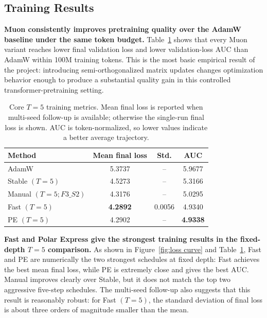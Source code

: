 \documentclass[10pt]{article}
\begin{document}
\subsection{Training Results}

\textbf{Muon consistently improves pretraining quality over the AdamW baseline under the same token budget.} Table~\ref{tab:train} shows that every Muon variant reaches lower final validation loss and lower validation-loss AUC than AdamW within 100M training tokens. This is the most basic empirical result of the project: introducing semi-orthogonalized matrix updates changes optimization behavior enough to produce a substantial quality gain in this controlled transformer-pretraining setting.

\begin{table}[htbp]
\centering

\centering
\caption{Core $T=5$ training metrics. Mean final loss is reported when multi-seed follow-up is available; otherwise the single-run final loss is shown. AUC is token-normalized, so lower values indicate a better average trajectory.}
\label{tab:train}
\small
\begin{tabular*}{0.72\linewidth}{@{\extracolsep{\fill}}lccc@{}}
\toprule
Method & Mean final loss & Std. & AUC \\
\midrule
AdamW & 5.3737 & -- & 5.9677 \\
Stable $(T=5)$ & 4.5273 & -- & 5.3166 \\
Manual $(T=5;F3\_S2)$& 4.3176 & -- & 5.0295 \\
Fast $(T=5)$ & \textbf{4.2892} & 0.0056 & 4.9340 \\
PE $(T=5)$ & 4.2902 & -- & \textbf{4.9338} \\
\bottomrule
\end{tabular*}
\end{table}

\textbf{Fast and Polar Express give the strongest training results in the fixed-depth $T=5$ comparison.} As shown in Figure~\ref{fig:loss curve} and Table~\ref{tab:train}, Fast and PE are numerically the two strongest schedules at fixed depth: Fast achieves the best mean final loss, while PE is extremely close and gives the best AUC. Manual improves clearly over Stable, but it does not match the top two aggressive five-step schedules. The multi-seed follow-up also suggests that this result is reasonably robust: for Fast $(T=5)$, the standard deviation of final loss is about three orders of magnitude smaller than the mean.
\end{document}
